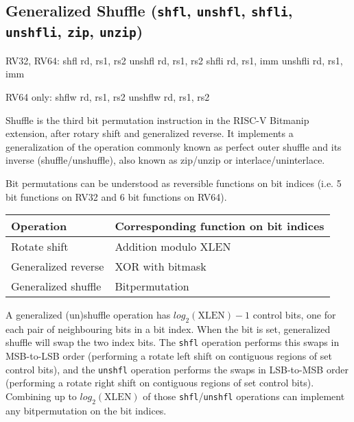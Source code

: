 %
%
%


\subsection{Generalized Shuffle (\texttt{shfl}, \texttt{unshfl}, \texttt{shfli}, \texttt{unshfli}, \texttt{zip}, \texttt{unzip})}
\label{gzip}

\begin{rvb}
  RV32, RV64:
    shfl    rd, rs1, rs2
    unshfl  rd, rs1, rs2
    shfli   rd, rs1, imm
    unshfli rd, rs1, imm

  RV64 only:
    shflw    rd, rs1, rs2
    unshflw  rd, rs1, rs2
\end{rvb}

Shuffle is the third bit permutation instruction in the RISC-V Bitmanip
extension, after rotary shift and generalized reverse. It implements a
generalization of the operation commonly known as perfect outer shuffle and its
inverse (shuffle/unshuffle), also known as zip/unzip or interlace/uninterlace.

Bit permutations can be understood as reversible functions on bit indices (i.e.
5 bit functions on RV32 and 6 bit functions on RV64).

\begin{center}
\begin{tabular}{l l}
Operation & Corresponding function on bit indices \\
\hline
Rotate shift & Addition modulo {\rm XLEN} \\
Generalized reverse & XOR with bitmask \\
Generalized shuffle & Bitpermutation \\
\end{tabular}
\end{center}

A generalized (un)shuffle operation has $log_2(\textrm{XLEN})-1$ control bits,
one for each pair of neighbouring bits in a bit index. When the bit is set,
generalized shuffle will swap the two index bits. The {\tt shfl} operation
performs this swaps in MSB-to-LSB order (performing a rotate left shift on
contiguous regions of set control bits), and the {\tt unshfl} operation performs
the swaps in LSB-to-MSB order (performing a rotate right shift on contiguous
regions of set control bits). Combining up to $log_2(\textrm{XLEN})$ of those
{\tt shfl}/{\tt unshfl} operations can implement any bitpermutation on the
bit indices.

